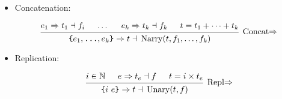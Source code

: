 \documentclass{article}
\DeclareMathOperator{\Unary}{Unary}
\DeclareMathOperator{\Narry}{Narry}
\renewcommand{\S}{\ensuremath{\Rightarrow}}
\newcommand{\s}[3]{#1 \S{} #2 \dashv{} #3}
\begin{document}
\begin{itemize}[leftmargin=*]
    \item Concatenation:

          \begin{equation*}
              \begin{prooftree}
                  \hypo{\s{e_1}{t_1}{f_i}}
                  \hypo{\dots}
                  \hypo{\s{e_k}{t_k}{f_k}}
                  \hypo{t = t_1 + \cdots + t_k}
                  \infer4[Concat\S]{\s{\texttt{\{}e_1, \texttt{\dots}, e_k \texttt{\}}}{t}
                      {\Narry(t, f_1, \dots, f_k)}}
              \end{prooftree}
          \end{equation*}


    \item Replication:

          \begin{equation*}
              \begin{prooftree}
                  \hypo{i \in \mathbb{N}}
                  \hypo{\s{e}{t_e}{f}}
                  \hypo{t = i \times t_e}
                  \infer3[Repl\S]{\s{\texttt{\{}i~e\texttt{\}}}{t}{\Unary(t, f)}}
              \end{prooftree}
          \end{equation*}
\end{itemize}
\end{document}
